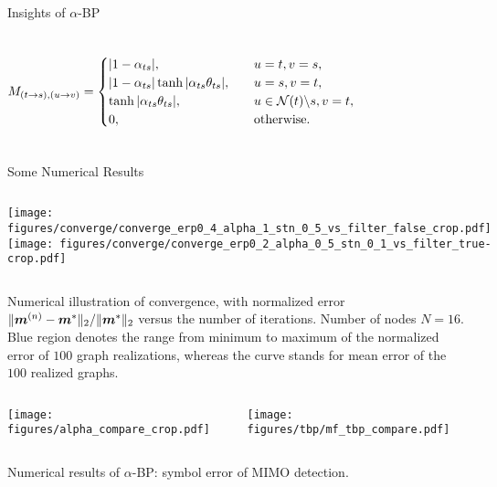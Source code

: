 \begin{frame}{Insights of $\alpha$-BP}
{\begin{columns}
      \begin{align*}
        M_{(t\rightarrow s), (u \rightarrow v)} =
        \begin{cases}
          |  1 - \alpha_{ts} |, &\quad u=t, v=s, \\
          |  1 - \alpha_{ts} | \tanh | \alpha_{ts} \theta_{ts} |, & \quad u = s, v =t, \\
          \tanh| \alpha_{ts} \theta_{ts} |, & \quad u \in \mathcal{N}(t)\backslash s, v = t, \\
          0, & \quad \mathrm{otherwise}.
        \end{cases}
      \end{align*}
    \end{columns}
  }
\end{frame}
\begin{frame}{Some Numerical Results}
  
  \graphicspath{{../source/chapter3/}}
  \begin{columns}
    \texttt{[image: figures/converge/converge\_erp0\_4\_alpha\_1\_stn\_0\_5\_vs\_filter\_false\_crop.pdf]}
    \texttt{[image: figures/converge/converge\_erp0\_2\_alpha\_0\_5\_stn\_0\_1\_vs\_filter\_true-crop.pdf]}
  \end{columns}
  \centering
  {\tiny Numerical illustration of convergence, with normalized error ${\| \bm{m}^{(n)}-\bm{m}^{\ast} \|_{2}}/{\| \bm{m}^{\ast} \|_{2}}$ versus the number of iterations. Number of nodes $N=16$. Blue region denotes the range from minimum to maximum of the normalized error of $100$ graph realizations, whereas the curve stands for mean error of the $100$ realized graphs. }
  \vskip -0.2cm
  \begin{columns}
    \begin{center}
      \texttt{[image: figures/alpha\_compare\_crop.pdf]}
    \end{center}
    \centering
    \texttt{[image: figures/tbp/mf\_tbp\_compare.pdf]}
  \end{columns}
  \centering
  {\tiny Numerical results of $\alpha$-BP: symbol error of MIMO detection.}

\end{frame}




